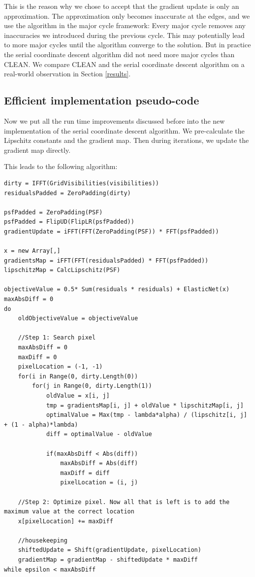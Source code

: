 This is the reason why we chose to accept that the gradient update is only an approximation. The approximation only becomes inaccurate at the edges, and we use the algorithm in the major cycle framework: Every major cycle removes any inaccuracies we introduced during the previous cycle. This may potentially lead to more major cycles until the algorithm converge to the solution. But in practice the serial coordinate descent algorithm did not need more major cycles than CLEAN. We compare CLEAN and the serial coordinate descent algorithm on a real-world observation in Section \ref{results}.

\subsection{Efficient implementation pseudo-code}
Now we put all the run time improvements discussed before into the new implementation of the serial coordinate descent algorithm. We pre-calculate the Lipschitz constants and the gradient map. Then during iterations, we update the gradient map directly.

This leads to the following algorithm:
\begin{lstlisting}
dirty = IFFT(GridVisibilities(visibilities))
residualsPadded = ZeroPadding(dirty)

psfPadded = ZeroPadding(PSF)
psfPadded = FlipUD(FlipLR(psfPadded))
gradientUpdate = iFFT(FFT(ZeroPadding(PSF)) * FFT(psfPadded))

x = new Array[,]
gradientsMap = iFFT(FFT(residualsPadded) * FFT(psfPadded))
lipschitzMap = CalcLipschitz(PSF)

objectiveValue = 0.5* Sum(residuals * residuals) + ElasticNet(x)
maxAbsDiff = 0
do 
	oldObjectiveValue = objectiveValue
	
	//Step 1: Search pixel
	maxAbsDiff = 0
	maxDiff = 0
	pixelLocation = (-1, -1)
	for(i in Range(0, dirty.Length(0))
		for(j in Range(0, dirty.Length(1))
			oldValue = x[i, j]
			tmp = gradientsMap[i, j] + oldValue * lipschitzMap[i, j]
			optimalValue = Max(tmp - lambda*alpha) / (lipschitz[i, j] + (1 - alpha)*lambda)
			diff = optimalValue - oldValue
			
			if(maxAbsDiff < Abs(diff))
				maxAbsDiff = Abs(diff)
				maxDiff = diff
				pixelLocation = (i, j)
	
	//Step 2: Optimize pixel. Now all that is left is to add the maximum value at the correct location
	x[pixelLocation] += maxDiff
	
	//housekeeping
	shiftedUpdate = Shift(gradientUpdate, pixelLocation)
	gradientMap = gradientMap - shiftedUpdate * maxDiff
while epsilon < maxAbsDiff
\end{lstlisting}

